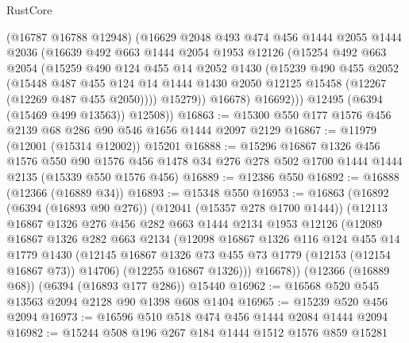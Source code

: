 \begin{lexlean}{RustCore}
\begin{coremodule}
            (@16787 @16788 @12948)
            (@16629
              @2048
              @493
              @474
              @456
              @1444
              @2055
              @1444
              @2036
              (@16639
                @492
                @663
                @1444
                @2054
                @1953
                @12126
                (@15254
                  @492
                  @663
                  @2054
                  (@15259
                    @490
                    @124
                    @455
                    @14
                    @2052
                    @1430
                    (@15239
                      @490
                      @455
                      @2052
                      (@15448
                        @487
                        @455
                        @124
                        @14
                        @1444
                        @1430
                        @2050
                        @12125
                        @15458
                        (@12267 (@12269 @487 @455 @2050))))
                    @15279))
                @16678)
              @16692)))
        @12495
        (@6394 (@15469 @499 @13563))
        @12508))
@16863 := @15300 @550 @177 @1576 @456 @2139 @68 @286 @90 @546 @1656 @1444 @2097 @2129
@16867 := @11979 (@12001 (@15314 @12002)) @15201
@16888 := @15296
    @16867
    @1326
    @456
    @1576
    @550
    @90
    @1576
    @456
    @1478
    @34
    @276
    @278
    @502
    @1700
    @1444
    @1444
    @2135
    (@15339 @550 @1576 @456)
@16889 := @12386 @550
@16892 := @16888 (@12366 (@16889 @34))
@16893 := @15348 @550
@16953 := @16863
    (@16892
      (@6394 (@16893 @90 @276))
      (@12041 (@15357 @278 @1700 @1444))
      (@12113
        @16867
        @1326
        @276
        @456
        @282
        @663
        @1444
        @2134
        @1953
        @12126
        (@12089
          @16867
          @1326
          @282
          @663
          @2134
          (@12098
            @16867
            @1326
            @116
            @124
            @455
            @14
            @1779
            @1430
            (@12145 @16867 @1326 @73 @455 @73 @1779 (@12153 (@12154 @16867 @73)) @14706)
            (@12255 @16867 @1326)))
        @16678))
    (@12366 (@16889 @68))
    (@6394 (@16893 @177 @286))
    @15440
@16962 := @16568 @520 @545 @13563 @2094 @2128 @90 @1398 @608 @1404
@16965 := @15239 @520 @456 @2094
@16973 := @16596 @510 @518 @474 @456 @1444 @2084 @1444 @2094
@16982 := @15244 @508 @196 @267 @184 @1444 @1512 @1576 @859 @15281

\end{coremodule}
\end{lexlean}
